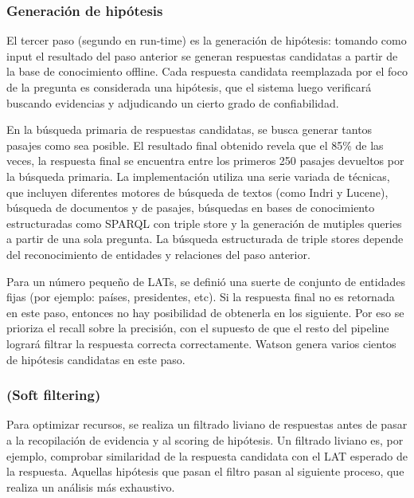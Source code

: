 \subsubsection{Generaci\'on de hipótesis}

El tercer paso (segundo en run-time) es la generaci\'on de hip\'otesis:
tomando como input el resultado del paso anterior se generan respuestas
candidatas a partir de la base de conocimiento offline. Cada respuesta
candidata reemplazada por el foco de la pregunta es considerada una
hip\'otesis, que el sistema luego verificar\'a buscando evidencias y
adjudicando un cierto grado de confiabilidad.

En la b\'usqueda primaria de respuestas candidatas, se busca generar
tantos pasajes como sea posible. El resultado final obtenido revela que
el 85\% de las veces, la respuesta final se encuentra entre los
primeros 250 pasajes devueltos por la b\'usqueda primaria. La
implementaci\'on utiliza una serie variada de t\'ecnicas, que incluyen
diferentes motores de b\'usqueda de textos (como Indri y Lucene),
b\'usqueda de documentos y de pasajes, b\'usquedas en bases de
conocimiento estructuradas como SPARQL con triple store y la
generaci\'on de mutiples queries a partir de una sola pregunta. La
b\'usqueda estructurada de triple stores depende del reconocimiento de
entidades y relaciones del paso anterior.

Para un n\'umero peque\~no de LATs, se defini\'o una suerte de conjunto
de entidades fijas (por ejemplo: pa\'ises, presidentes, etc). Si la
respuesta final no es retornada en este paso, entonces no hay
posibilidad de obtenerla en los siguiente. Por eso se prioriza el
recall sobre la precisi\'on, con el supuesto de que el resto del
pipeline lograr\'a filtrar la respuesta correcta correctamente. Watson
genera varios cientos de hip\'otesis candidatas en este paso.


\bigskip

\subsubsection*{(Soft filtering)}

Para optimizar recursos, se realiza un filtrado liviano de respuestas
antes de pasar a la recopilaci\'on de evidencia y al scoring de
hip\'otesis. Un filtrado liviano es, por ejemplo, comprobar similaridad
de la respuesta candidata con el LAT esperado de la respuesta. Aquellas
hip\'otesis que pasan el filtro pasan al siguiente proceso, que realiza
un an\'alisis m\'as exhaustivo.


